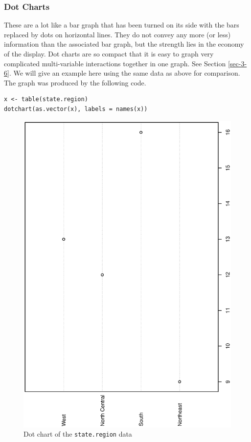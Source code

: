 \documentclass[captions=tableheading]{scrbook}
\begin{document}
\subsubsection{Dot Charts}
\label{sec-3-1-4-4}
\label{par:Dotcharts}


These are a lot like a bar graph that has been turned on its side with the bars replaced by dots on horizontal lines. They do not convey any more (or less) information than the associated bar graph, but the strength lies in the economy of the display. Dot charts are so compact that it is easy to graph very complicated multi-variable interactions together in one graph. See Section \ref{sec-3-6}. We will give an example here using the same data as above for comparison. The graph was produced by the following code.

\begin{example}


\begin{verbatim}
x <- table(state.region)
dotchart(as.vector(x), labels = names(x))
\end{verbatim}





\begin{figure}[th]
  \includegraphics[angle=270, totalheight=4in]{ps/datadesc/dot-charts.ps}
  \caption{Dot chart of the \texttt{state.region} data}
  \label{fig-dot-charts}
\end{figure}



\end{example}
\end{document}

